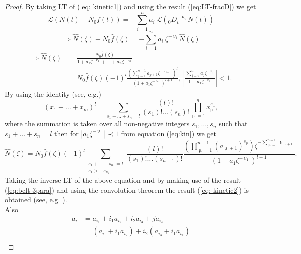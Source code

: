 \documentclass[a4paper,12pt]{article}
\theoremstyle{remark}
\begin{document}
\begin{proof}
By taking LT of (\ref{eq: kinetic1}) and using the result (\ref{eq:LT-fracD}) we get
\begin{equation}
\mathcal{L}\left( 	N(t)-N_0f(t)\right) =-\sum_{i=1}^{n}{a_i}~ \mathcal{L}\left(  _0D^{-\upnu_i}_tN(t)\right) 
\end{equation}	
\begin{equation}
\Rightarrow \hat { N}(\zeta) -N_0\hat{f}(\zeta)=-\sum_{i=1}^{n}{a_i}~ \zeta^{-\upnu_i}\hat { N}(\zeta)
\end{equation}
\begin{equation}\label{eq:kin}
\begin{split}
\Rightarrow \hat { N}(\zeta)&=\frac{N_0\hat{f}(\zeta)}{1+a_1 \zeta^{-\upnu_1}+\dots+a_n\zeta^{-\upnu_n}}\\
&=N_0\hat{f}(\zeta)(-1)^l\frac{\left( \sum_{j=1}^{n-1}a_{j+1}\zeta^{-\upnu_{j+1}}\right)^l }{(1+a_1\zeta^{-\upnu_1})^{l+1}},~\left| \frac{\sum_{j=2}^{n}a_{j}\zeta^{-\upnu_{j}}}{1+a_1\zeta^{-\upnu_{1}}}\right| <1.
\end{split}
\end{equation}
By using the identity (see, e.g.\cite{saxena2010})
\begin{equation}
(x_1+\dots+x_m)^l=\sum_{s_1+\dots+s_{n}=l} \frac{(l)!}{(s_1)!\dots (s_n)!}\prod_{\upmu=1}^{n}x_\upmu^{s_\upmu},
\end{equation}
where the summation  is taken over all non-negative integers $s_1,\dots, s_n$ such that $s_1+\dots+ s_{n}=l$ then for $|a_1\zeta^{-\upnu_{1}}|\prec1$ from equation (\ref{eq:kin})  we get
\begin{equation}
\hat { N}(\zeta)=N_0\hat{f}(\zeta)(-1)^l \sum_{\substack{s_1+\dots+s_{n_1}=l\\s_1>\dots s_{n_1}}} \frac{(l)!}{(s_1)!\dots (s_{n-1})!} \frac{\left( \prod_{\upmu=1}^{n-1}(a_{\upmu+1})^{s_\upmu}\right)\zeta^{-\sum_{\upmu=1}^{n-1}\upnu_{\upmu+1}}}{(1+a_1\zeta^{-\upnu_{1}})^{l+1}}. 
\end{equation}
Taking the inverse LT of the above equation and by making use of the result (\ref{eq:bclt 3para}) and using the convolution theorem %
the result (\ref{eq: kinetic2}) is obtained (see, e.g. \cite{saxena2010}).\\
	Also
\begin{equation}\label{eq:an1}
\begin{split}
a_i&=a_{i_1} +i_1a_{i_2}+i_2a_{i_3}+j a_{i_4}\\
&=(a_{i_1} +i_1a_{i_2})+i_2(a_{i_3}+i_1a_{i_4})\\

\end{split}
\end{equation}
\end{proof}
\end{document}
